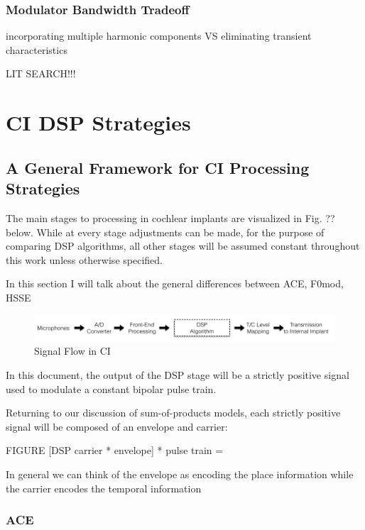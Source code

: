 \documentclass [11pt, proquest] {uwthesis}[2015/03/03]
\begin{document}
\subsection{Modulator Bandwidth Tradeoff}

incorporating multiple harmonic components VS eliminating transient characteristics


LIT SEARCH!!!



\chapter{CI DSP Strategies}


\section{A General Framework for CI Processing Strategies}

The main stages to processing in cochlear implants are visualized in Fig. ?? below.  While at every stage adjustments can be made, for the purpose of comparing DSP algorithms, all other stages will be assumed constant throughout this work unless otherwise specified.

In this section I will talk about the general differences between ACE, F0mod, HSSE

\begin{figure}[!ht]
  \centering
    \includegraphics[width=1.0\textwidth]{CI_Signal_FlowTEMP}   
    \caption{Signal Flow in CI}
\end{figure}

In this document, the output of the DSP stage will be a strictly positive signal used to modulate a constant bipolar pulse train.

Returning to our discussion of sum-of-products models, each strictly positive signal will be composed of an envelope and carrier:

FIGURE
[DSP carrier * envelope] * pulse train = ~~~

In general we can think of the envelope as encoding the place information while the carrier encodes the temporal information

\subsection{ACE}
\end{document}
